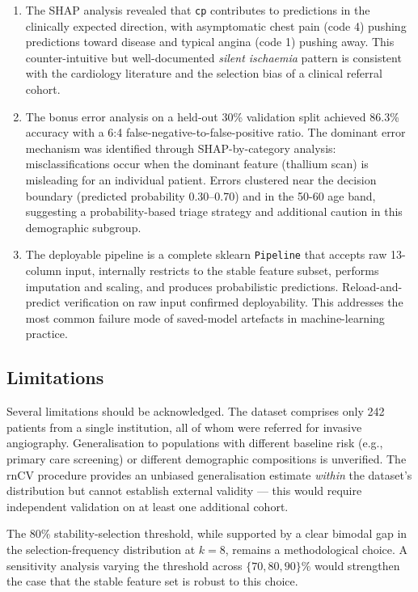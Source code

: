 \begin{enumerate}
    \item The SHAP analysis revealed that \texttt{cp} contributes to predictions in the clinically expected direction, with asymptomatic chest pain (code 4) pushing predictions toward disease and typical angina (code 1) pushing away. This counter-intuitive but well-documented \emph{silent ischaemia} pattern is consistent with the cardiology literature and the selection bias of a clinical referral cohort.

    \item The bonus error analysis on a held-out 30\% validation split achieved 86.3\% accuracy with a 6:4 false-negative-to-false-positive ratio. The dominant error mechanism was identified through SHAP-by-category analysis: misclassifications occur when the dominant feature (thallium scan) is misleading for an individual patient. Errors clustered near the decision boundary (predicted probability 0.30--0.70) and in the 50-60 age band, suggesting a probability-based triage strategy and additional caution in this demographic subgroup.

    \item The deployable pipeline is a complete sklearn \texttt{Pipeline} that accepts raw 13-column input, internally restricts to the stable feature subset, performs imputation and scaling, and produces probabilistic predictions. Reload-and-predict verification on raw input confirmed deployability. This addresses the most common failure mode of saved-model artefacts in machine-learning practice.
\end{enumerate}

\subsection{Limitations}

Several limitations should be acknowledged. The dataset comprises only 242 patients from a single institution, all of whom were referred for invasive angiography. Generalisation to populations with different baseline risk (e.g., primary care screening) or different demographic compositions is unverified. The rnCV procedure provides an unbiased generalisation estimate \emph{within} the dataset's distribution but cannot establish external validity --- this would require independent validation on at least one additional cohort.

The 80\% stability-selection threshold, while supported by a clear bimodal gap in the selection-frequency distribution at $k = 8$, remains a methodological choice. A sensitivity analysis varying the threshold across $\{70, 80, 90\}\%$ would strengthen the case that the stable feature set is robust to this choice.

